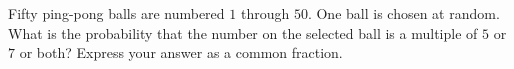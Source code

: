 Fifty ping-pong balls are numbered $1$ through $50$. One ball is chosen at random. What is the probability that the number on the selected ball is a multiple of $5$ or $7$ or both? Express your answer as a common fraction.
